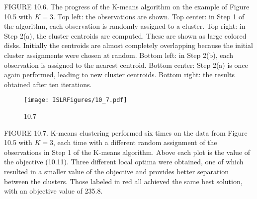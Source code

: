 \documentclass{beamer}
\begin{document}
                \begin{frame}
                 
                	 FIGURE 10.6. The progress of the K-means algorithm on the example of Figure
                	 10.5 with $K=3$. Top left: the observations are shown. Top center: in Step 1
                	 of the algorithm, each observation is randomly assigned to a cluster. Top right:
                	 in Step 2(a), the cluster centroids are computed. These are shown as large colored
                	 disks. Initially the centroids are almost completely overlapping because the
                	 initial cluster assignments were chosen at random. Bottom left: in Step 2(b),
                	 each observation is assigned to the nearest centroid. Bottom center: Step 2(a) is
                	 once again performed, leading to new cluster centroids. Bottom right: the results
                	 obtained after ten iterations.
                		 		
                		  
                		 \end{frame} 
                		\begin{frame}
                		 
                			\begin{figure}
                				\centering
                				
                				\centering
                				\texttt{[image: ISLRFigures/10\_7.pdf]}
                				\caption{10.7
                				}
                				
                				
                			\end{figure}
                		\end{frame} 
                		 
                		 
                		  \begin{frame}
                		  	 
                		   
                		  		FIGURE 10.7. K-means clustering performed six times on the data from Figure
                		  		10.5 with $K = 3$, each time with a different random assignment of the observations
                		  		in Step 1 of the K-means algorithm. Above each plot is the value of
                		  		the objective (10.11). Three different local optima were obtained, one of which
                		  		resulted in a smaller value of the objective and provides better separation between
                		  		the clusters. Those labeled in red all achieved the same best solution, with an
                		  		objective value of 235.8.
                		  
                
                \end{frame} 
                
\end{document}
